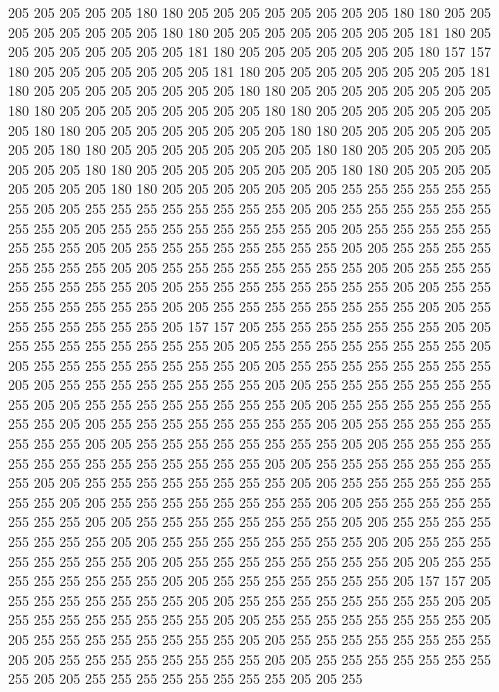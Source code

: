 205 205 205 205 205 180 180 205 205 205 205 205 205 205 205 180 180 205 205 205
205 205 205 205 205 180 180 205 205 205 205 205 205 205 205 181 180 205 205 205
205 205 205 205 205 181 180 205 205 205 205 205 205 205 180 157 157 180 205 205
205 205 205 205 205 181 180 205 205 205 205 205 205 205 205 181 180 205 205 205
205 205 205 205 205 180 180 205 205 205 205 205 205 205 205 180 180 205 205 205
205 205 205 205 205 180 180 205 205 205 205 205 205 205 205 180 180 205 205 205
205 205 205 205 205 180 180 205 205 205 205 205 205 205 205 180 180 205 205 205
205 205 205 205 205 180 180 205 205 205 205 205 205 205 205 180 180 205 205 205
205 205 205 205 205 180 180 205 205 205 205 205 205 205 205 180 180 205 205 205
205 205 205 205 255 255 255 255 255 255 255 205 205 255 255 255 255 255 255 255
255 205 205 255 255 255 255 255 255 255 255 205 205 255 255 255 255 255 255 255
255 205 205 255 255 255 255 255 255 255 255 205 205 255 255 255 255 255 255 255
255 205 205 255 255 255 255 255 255 255 255 205 205 255 255 255 255 255 255 255
255 205 205 255 255 255 255 255 255 255 255 205 205 255 255 255 255 255 255 255
255 205 205 255 255 255 255 255 255 255 255 205 205 255 255 255 255 255 255 255
255 205 205 255 255 255 255 255 255 255 205 157 157 205 255 255 255 255 255 255
255 205 205 255 255 255 255 255 255 255 255 205 205 255 255 255 255 255 255 255
255 205 205 255 255 255 255 255 255 255 255 205 205 255 255 255 255 255 255 255
255 205 205 255 255 255 255 255 255 255 255 205 205 255 255 255 255 255 255 255
255 205 205 255 255 255 255 255 255 255 255 205 205 255 255 255 255 255 255 255
255 205 205 255 255 255 255 255 255 255 255 205 205 255 255 255 255 255 255 255
255 205 205 255 255 255 255 255 255 255 255 205 205 255 255 255 255 255 255 255
255 255 255 255 255 255 255 205 205 255 255 255 255 255 255 255 255 205 205 255
255 255 255 255 255 255 255 205 205 255 255 255 255 255 255 255 255 205 205 255
255 255 255 255 255 255 255 205 205 255 255 255 255 255 255 255 255 205 205 255
255 255 255 255 255 255 255 205 205 255 255 255 255 255 255 255 255 205 205 255
255 255 255 255 255 255 255 205 205 255 255 255 255 255 255 255 255 205 205 255
255 255 255 255 255 255 255 205 205 255 255 255 255 255 255 255 255 205 205 255
255 255 255 255 255 255 205 157 157 205 255 255 255 255 255 255 255 205 205 255
255 255 255 255 255 255 255 205 205 255 255 255 255 255 255 255 255 205 205 255
255 255 255 255 255 255 255 205 205 255 255 255 255 255 255 255 255 205 205 255
255 255 255 255 255 255 255 205 205 255 255 255 255 255 255 255 255 205 205 255
255 255 255 255 255 255 255 205 205 255 255 255 255 255 255 255 255 205 205 255
